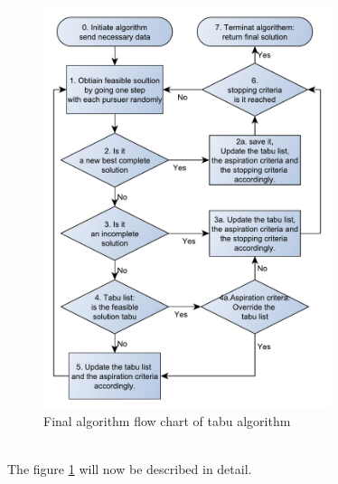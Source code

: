 \begin{figure}[!h]
\centering
\includegraphics[width=0.75\textwidth,height=0.70\textheight]{chapter_4_methods/ny_Tabu}
\caption[Final algorithm flow chart of tabu algorithm]
{Final algorithm flow chart of tabu algorithm}
\label{t2}
\end{figure}
\\The figure \ref{t2} will now be described in detail.
